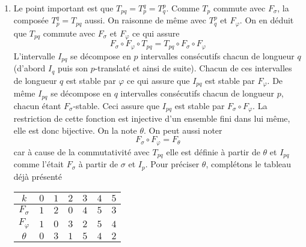\begin{enumerate}
 \item Le point important est que $T_{pq} = T_p^{q} = T_q^{p}$. Comme $T_p$ commute avec $F_\sigma$, la composée $T_p^q = T_{pq}$ aussi. On raisonne de même avec $T_q^p$ et $F_\varphi$. On en déduit que $T_{pq}$ commute avec $F_\sigma$ et $F_\varphi$ ce qui assure
\begin{displaymath}
 F_\sigma \circ F_\varphi \circ T_{pq} = T_{pq} \circ F_\sigma \circ F_\varphi
\end{displaymath}
L'intervalle $I_{pq}$ se décompose en $p$ intervalles consécutifs chacun de longueur $q$ (d'abord $I_q$ puis son $p$-translaté et ainsi de suite). Chacun de ces intervalles de longueur $q$ est stable par $\varphi$ ce qui assure que $I_{pq}$ est stable par $F_\varphi$. De même $I_{pq}$ se décompose en $q$ intervalles consécutifs chacun de longueur $p$, chacun étant $F_\sigma$-stable. Ceci assure que $I_{pq}$ est stable par $F_\sigma \circ F_\varphi$. La restriction de cette fonction est injective d'un ensemble fini dans lui même, elle est donc bijective. On la note $\theta$. On peut aussi noter
\begin{displaymath}
F_\sigma \circ F_\varphi = F_\theta 
\end{displaymath}
car à cause de la commutativité avec $T_{pq}$ elle est définie à partir de $\theta$ et $I_{pq}$ comme l'était $F_\sigma$ à partir de $\sigma$ et $I_p$. Pour préciser $\theta$, complétons le tableau déjà présenté
\begin{center}
\renewcommand{\arraystretch}{1.2}
\begin{tabular}{c|cccccc}
$k$            & $0$ & $1$ & $2$ & $3$ & $4$ & $5$  \\ \hline
$F_\sigma$     & $1$ & $2$ & $0$ & $4$ & $5$ & $3$  \\ \hline 
$F_\varphi$    & $1$ & $0$ & $3$ & $2$ & $5$ & $4$  \\ \hline 
$\theta$     & $0$ & $3$ & $1$ & $5$ & $4$ & $2$  
\end{tabular}
\end{center}

\end{enumerate}

